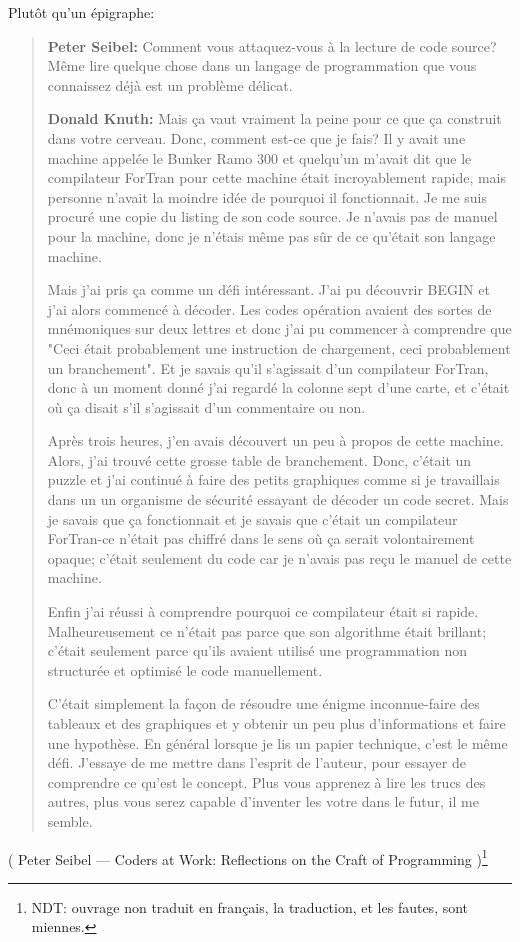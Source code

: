 Plutôt qu'un épigraphe:

\begin{framed}
\begin{quotation}

\textbf{Peter Seibel:} Comment vous attaquez-vous à la lecture de code source? Même lire
quelque chose dans un langage de programmation que vous connaissez déjà est un problème
délicat.

\textbf{Donald Knuth:} Mais ça vaut vraiment la peine pour ce que ça construit dans votre
cerveau. Donc, comment est-ce que je fais? Il y avait une machine appelée le Bunker
Ramo 300 et quelqu'un m'avait dit que le compilateur ForTran pour cette machine était
incroyablement rapide, mais personne n'avait la moindre idée de pourquoi il fonctionnait.
Je me suis procuré une copie du listing de son code source. Je n'avais pas de manuel
pour la machine, donc je n'étais même pas sûr de ce qu'était son langage machine.

Mais j'ai pris ça comme un défi intéressant. J'ai pu découvrir BEGIN et j'ai alors
commencé à décoder. Les codes opération avaient des sortes de mnémoniques sur deux
lettres et donc j'ai pu commencer à comprendre que "Ceci était probablement une
instruction de chargement, ceci probablement un branchement". Et je savais qu'il
s'agissait d'un compilateur ForTran, donc à un moment donné j'ai regardé la colonne
sept d'une carte, et c'était où ça disait s'il s'agissait d'un commentaire
ou non.

Après trois heures, j'en avais découvert un peu à propos de cette machine. Alors,
j'ai trouvé cette grosse table de branchement. Donc, c'était un puzzle et j'ai continué
à faire des petits graphiques comme si je travaillais dans un un organisme de sécurité
essayant de décoder un code secret. Mais je savais que ça fonctionnait et je savais
que c'était un compilateur ForTran-ce n'était pas chiffré dans le sens où ça serait
volontairement opaque; c'était seulement du code car je n'avais pas reçu le manuel
de cette machine.

Enfin j'ai réussi à comprendre pourquoi ce compilateur était si rapide.
Malheureusement ce n'était pas parce que son algorithme était brillant; c'était
seulement parce qu'ils avaient utilisé une programmation non structurée et optimisé
le code manuellement.

C'était simplement la façon de résoudre une énigme inconnue-faire des tableaux et
des graphiques et y obtenir un peu plus d'informations et faire une hypothèse. En
général lorsque je lis un papier technique, c'est le même défi. J'essaye de me mettre
dans l'esprit de l'auteur, pour essayer de comprendre ce qu'est le concept. Plus
vous apprenez à lire les trucs des autres, plus vous serez capable d'inventer les
votre dans le futur, il me semble.

\end{quotation}
\end{framed}

( Peter Seibel --- Coders at Work: Reflections on the Craft of Programming )\footnote{NDT:
ouvrage non traduit en français, la traduction, et les fautes, sont miennes.}


